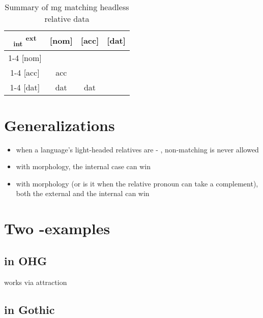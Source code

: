 \begin{table}[H]
  \center
  \caption {Summary of \ac{mg} matching headless relative data}
		\begin{tabular}{c|c|c|c}
		  \toprule
			\textsubscript{\ac{int}} \textsuperscript{\ac{ext}}
		        & [\ac{nom}]
		        & [\ac{acc}]
		        & [\ac{dat}]
		        \\ \cmidrule{1-4}
		    [\ac{nom}]
		        &
		        &
		        &
		        \\ \cmidrule{1-4}
		    [\ac{acc}]
		        & \ac{acc}
		        &
		        &
		        \\ \cmidrule{1-4}
		    [\ac{dat}]
		        & \ac{dat}
		        & \ac{dat}
		        &
		        \\
		  \bottomrule
		\end{tabular}
\end{table}







\section{Generalizations}

\begin{itemize}
  \item when a language's light-headed relatives are  - , non-matching is never allowed
  \item with  morphology, the internal case can win
  \item with  morphology (or is it when the relative pronoun can take a complement), both the external and the internal can win
\end{itemize}


\section{Two -examples}

\subsection{ in OHG}

works via attraction

\subsection{ in Gothic}

